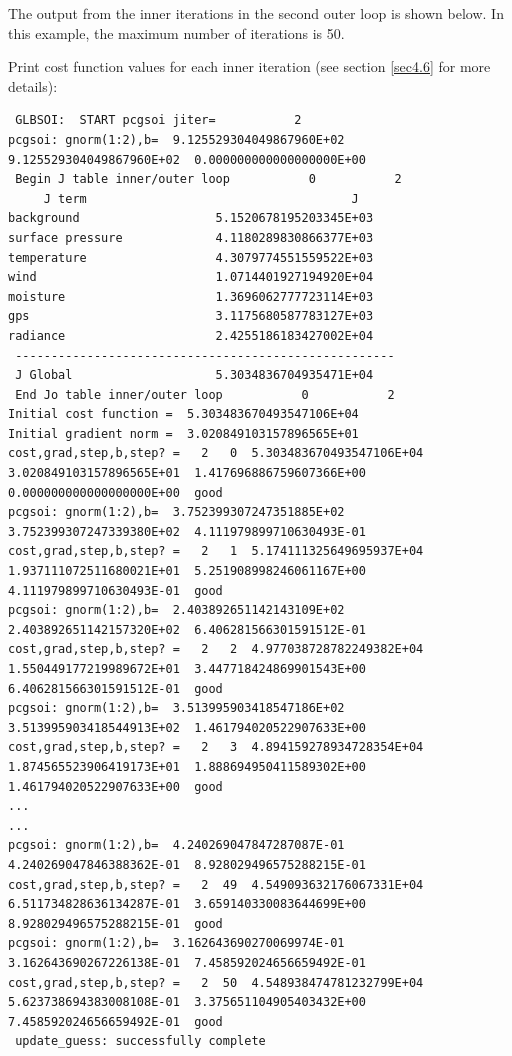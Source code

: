 The output from the inner iterations in the second outer loop is shown below. In this example, the maximum number of iterations is 50.

Print cost function values for each inner iteration (see section \ref{sec4.6} for more details): 

\begin{tiny}
\begin{verbatim}
 GLBSOI:  START pcgsoi jiter=           2
pcgsoi: gnorm(1:2),b=  9.125529304049867960E+02  9.125529304049867960E+02  0.000000000000000000E+00
 Begin J table inner/outer loop           0           2
     J term                                     J
background                   5.1520678195203345E+03
surface pressure             4.1180289830866377E+03
temperature                  4.3079774551559522E+03
wind                         1.0714401927194920E+04
moisture                     1.3696062777723114E+03
gps                          3.1175680587783127E+03
radiance                     2.4255186183427002E+04
 -----------------------------------------------------
 J Global                    5.3034836704935471E+04
 End Jo table inner/outer loop           0           2
Initial cost function =  5.303483670493547106E+04
Initial gradient norm =  3.020849103157896565E+01
cost,grad,step,b,step? =   2   0  5.303483670493547106E+04  3.020849103157896565E+01  1.417696886759607366E+00  0.000000000000000000E+00  good
pcgsoi: gnorm(1:2),b=  3.752399307247351885E+02  3.752399307247339380E+02  4.111979899710630493E-01
cost,grad,step,b,step? =   2   1  5.174111325649695937E+04  1.937111072511680021E+01  5.251908998246061167E+00  4.111979899710630493E-01  good
pcgsoi: gnorm(1:2),b=  2.403892651142143109E+02  2.403892651142157320E+02  6.406281566301591512E-01
cost,grad,step,b,step? =   2   2  4.977038728782249382E+04  1.550449177219989672E+01  3.447718424869901543E+00  6.406281566301591512E-01  good
pcgsoi: gnorm(1:2),b=  3.513995903418547186E+02  3.513995903418544913E+02  1.461794020522907633E+00
cost,grad,step,b,step? =   2   3  4.894159278934728354E+04  1.874565523906419173E+01  1.888694950411589302E+00  1.461794020522907633E+00  good
...
...
pcgsoi: gnorm(1:2),b=  4.240269047847287087E-01  4.240269047846388362E-01  8.928029496575288215E-01
cost,grad,step,b,step? =   2  49  4.549093632176067331E+04  6.511734828636134287E-01  3.659140330083644699E+00  8.928029496575288215E-01  good
pcgsoi: gnorm(1:2),b=  3.162643690270069974E-01  3.162643690267226138E-01  7.458592024656659492E-01
cost,grad,step,b,step? =   2  50  4.548938474781232799E+04  5.623738694383008108E-01  3.375651104905403432E+00  7.458592024656659492E-01  good
 update_guess: successfully complete
\end{verbatim}
\end{tiny}

